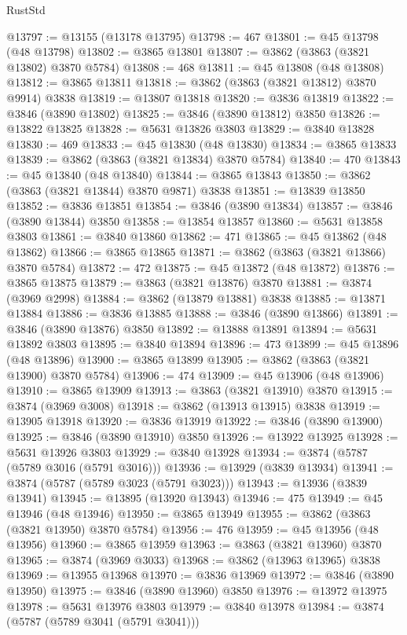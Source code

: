 \begin{lexlean}{RustStd}
\begin{coremodule}
@13797 := @13155 (@13178 @13795)
@13798 := 467
@13801 := @45 @13798 (@48 @13798)
@13802 := @3865 @13801
@13807 := @3862 (@3863 (@3821 @13802) @3870 @5784)
@13808 := 468
@13811 := @45 @13808 (@48 @13808)
@13812 := @3865 @13811
@13818 := @3862 (@3863 (@3821 @13812) @3870 @9914) @3838
@13819 := @13807 @13818
@13820 := @3836 @13819
@13822 := @3846 (@3890 @13802)
@13825 := @3846 (@3890 @13812) @3850
@13826 := @13822 @13825
@13828 := @5631 @13826 @3803
@13829 := @3840 @13828
@13830 := 469
@13833 := @45 @13830 (@48 @13830)
@13834 := @3865 @13833
@13839 := @3862 (@3863 (@3821 @13834) @3870 @5784)
@13840 := 470
@13843 := @45 @13840 (@48 @13840)
@13844 := @3865 @13843
@13850 := @3862 (@3863 (@3821 @13844) @3870 @9871) @3838
@13851 := @13839 @13850
@13852 := @3836 @13851
@13854 := @3846 (@3890 @13834)
@13857 := @3846 (@3890 @13844) @3850
@13858 := @13854 @13857
@13860 := @5631 @13858 @3803
@13861 := @3840 @13860
@13862 := 471
@13865 := @45 @13862 (@48 @13862)
@13866 := @3865 @13865
@13871 := @3862 (@3863 (@3821 @13866) @3870 @5784)
@13872 := 472
@13875 := @45 @13872 (@48 @13872)
@13876 := @3865 @13875
@13879 := @3863 (@3821 @13876) @3870
@13881 := @3874 (@3969 @2998)
@13884 := @3862 (@13879 @13881) @3838
@13885 := @13871 @13884
@13886 := @3836 @13885
@13888 := @3846 (@3890 @13866)
@13891 := @3846 (@3890 @13876) @3850
@13892 := @13888 @13891
@13894 := @5631 @13892 @3803
@13895 := @3840 @13894
@13896 := 473
@13899 := @45 @13896 (@48 @13896)
@13900 := @3865 @13899
@13905 := @3862 (@3863 (@3821 @13900) @3870 @5784)
@13906 := 474
@13909 := @45 @13906 (@48 @13906)
@13910 := @3865 @13909
@13913 := @3863 (@3821 @13910) @3870
@13915 := @3874 (@3969 @3008)
@13918 := @3862 (@13913 @13915) @3838
@13919 := @13905 @13918
@13920 := @3836 @13919
@13922 := @3846 (@3890 @13900)
@13925 := @3846 (@3890 @13910) @3850
@13926 := @13922 @13925
@13928 := @5631 @13926 @3803
@13929 := @3840 @13928
@13934 := @3874 (@5787 (@5789 @3016 (@5791 @3016)))
@13936 := @13929 (@3839 @13934)
@13941 := @3874 (@5787 (@5789 @3023 (@5791 @3023)))
@13943 := @13936 (@3839 @13941)
@13945 := @13895 (@13920 @13943)
@13946 := 475
@13949 := @45 @13946 (@48 @13946)
@13950 := @3865 @13949
@13955 := @3862 (@3863 (@3821 @13950) @3870 @5784)
@13956 := 476
@13959 := @45 @13956 (@48 @13956)
@13960 := @3865 @13959
@13963 := @3863 (@3821 @13960) @3870
@13965 := @3874 (@3969 @3033)
@13968 := @3862 (@13963 @13965) @3838
@13969 := @13955 @13968
@13970 := @3836 @13969
@13972 := @3846 (@3890 @13950)
@13975 := @3846 (@3890 @13960) @3850
@13976 := @13972 @13975
@13978 := @5631 @13976 @3803
@13979 := @3840 @13978
@13984 := @3874 (@5787 (@5789 @3041 (@5791 @3041)))

\end{coremodule}
\end{lexlean}
